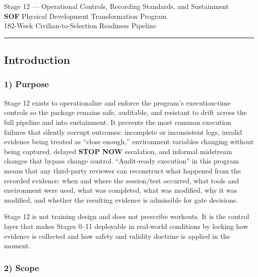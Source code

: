 \documentclass[10pt]{article}
\newcommand{\TitleLine}{\textcolor{StageBlue}{\rule{0.98\linewidth}{0.95pt}}}
\begin{document}
\begin{tcolorbox}
\begin{center}
Stage 12 — Operational Controls, Recording Standards, and Sustainment\\[0.35em]
\textbf{SOF} Physical Development Transformation Program\\[0.25em]
182-Week Civilian-to-Selection Readiness Pipeline\\[0.65em]
\TitleLine
\end{center}
\end{tcolorbox}

\vspace{0.35em}

{}

\subsection*{Introduction}
{}

\subsubsection*{1) Purpose}

Stage 12 exists to operationalize and enforce the program’s execution-time controls so the package remains safe, auditable, and resistant to drift across the full pipeline and into sustainment. It prevents the most common execution failures that silently corrupt outcomes: incomplete or inconsistent logs, invalid evidence being treated as “close enough,” environment variables changing without being captured, delayed \textbf{STOP} \textbf{NOW} escalation, and informal midstream changes that bypass change control. “Audit-ready execution” in this program means that any third-party reviewer can reconstruct what happened from the recorded evidence: when and where the session/test occurred, what tools and environment were used, what was completed, what was modified, why it was modified, and whether the resulting evidence is admissible for gate decisions.

Stage 12 is not training design and does not prescribe workouts. It is the control layer that makes Stages 0–11 deployable in real-world conditions by locking how evidence is collected and how safety and validity doctrine is applied in the moment.

\subsubsection*{2) Scope}
\end{document}
